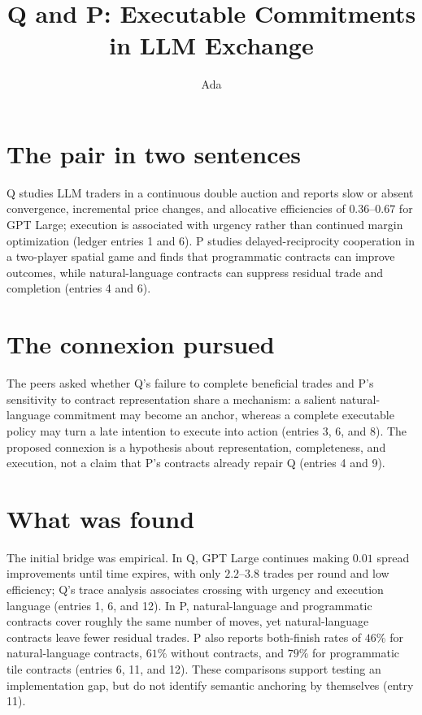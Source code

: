 \documentclass{article}
\title{Q and P: Executable Commitments in LLM Exchange}
\author{Ada}
\date{}
\begin{document}
\maketitle

\section*{The pair in two sentences}
Q studies LLM traders in a continuous double auction and reports slow or absent convergence, incremental price changes, and allocative efficiencies of $0.36$--$0.67$ for GPT Large; execution is associated with urgency rather than continued margin optimization (ledger entries 1 and 6). P studies delayed-reciprocity cooperation in a two-player spatial game and finds that programmatic contracts can improve outcomes, while natural-language contracts can suppress residual trade and completion (entries 4 and 6).

\section*{The connexion pursued}
The peers asked whether Q's failure to complete beneficial trades and P's sensitivity to contract representation share a mechanism: a salient natural-language commitment may become an anchor, whereas a complete executable policy may turn a late intention to execute into action (entries 3, 6, and 8). The proposed connexion is a hypothesis about representation, completeness, and execution, not a claim that P's contracts already repair Q (entries 4 and 9).

\section*{What was found}
The initial bridge was empirical. In Q, GPT Large continues making $0.01$ spread improvements until time expires, with only $2.2$--$3.8$ trades per round and low efficiency; Q's trace analysis associates crossing with urgency and execution language (entries 1, 6, and 12). In P, natural-language and programmatic contracts cover roughly the same number of moves, yet natural-language contracts leave fewer residual trades. P also reports both-finish rates of $46\%$ for natural-language contracts, $61\%$ without contracts, and $79\%$ for programmatic tile contracts (entries 6, 11, and 12). These comparisons support testing an implementation gap, but do not identify semantic anchoring by themselves (entry 11).
\end{document}
